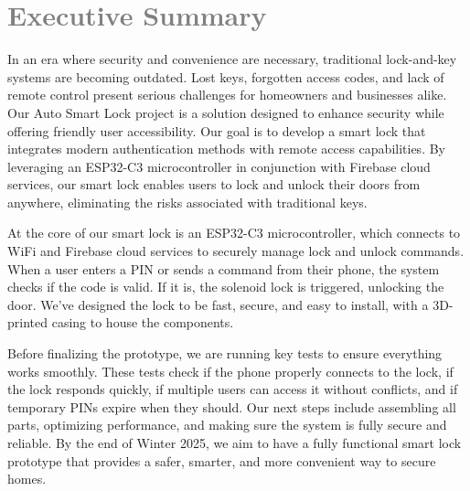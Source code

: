 \section*{\textcolor{gray}{Executive Summary}}

In an era where security and convenience are necessary, traditional lock-and-key systems are becoming outdated. Lost keys, forgotten access codes, and lack of remote control present serious challenges for homeowners and businesses alike. Our Auto Smart Lock project is a solution designed to enhance security while offering friendly user accessibility.
\newline
Our goal is to develop a smart lock that integrates modern authentication methods with remote access capabilities. By leveraging an ESP32-C3 microcontroller in conjunction with Firebase cloud services, our smart lock enables users to lock and unlock their doors from anywhere, eliminating the risks associated with traditional keys.
\newline

At the core of our smart lock is an ESP32-C3 microcontroller, which connects to WiFi and Firebase cloud services to securely manage lock and unlock commands. When a user enters a PIN or sends a command from their phone, the system checks if the code is valid. If it is, the solenoid lock is triggered, unlocking the door. We’ve designed the lock to be fast, secure, and easy to install, with a 3D-printed casing to house the components.
\newline

Before finalizing the prototype, we are running key tests to ensure everything works smoothly. These tests check if the phone properly connects to the lock, if the lock responds quickly, if multiple users can access it without conflicts, and if temporary PINs expire when they should. Our next steps include assembling all parts, optimizing performance, and making sure the system is fully secure and reliable. By the end of Winter 2025, we aim to have a fully functional smart lock prototype that provides a safer, smarter, and more convenient way to secure homes.